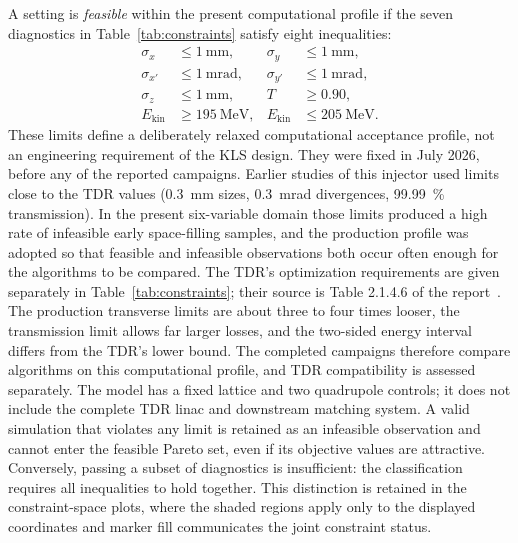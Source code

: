 \documentclass[aps,prab,reprint,superscriptaddress,amsmath,amssymb,floatfix]{revtex4-2}
\begin{document}
A setting is \emph{feasible} within the present computational profile if the seven diagnostics
in Table~\ref{tab:constraints} satisfy eight inequalities:
\begin{align}
 \sigma_x&\le\SI{1}{\milli\metre}, &\sigma_y&\le\SI{1}{\milli\metre},\\
 \sigma_{x'}&\le\SI{1}{\milli\radian}, &\sigma_{y'}&\le\SI{1}{\milli\radian},\\
 \sigma_z&\le\SI{1}{\milli\metre}, &T&\ge0.90,\\
 E_\mathrm{kin}&\ge\SI{195}{\mega\electronvolt}, &E_\mathrm{kin}&\le\SI{205}{\mega\electronvolt}.
\end{align}
These limits define a deliberately relaxed computational acceptance profile, not an
engineering requirement of the KLS design. They were fixed in July 2026, before any of the
reported campaigns. Earlier studies of this injector used limits close to the TDR values
(\SI{0.3}{\milli\metre} sizes, \SI{0.3}{\milli\radian} divergences, \SI{99.99}{\percent}
transmission). In the present six-variable domain those limits produced a high rate of
infeasible early space-filling samples, and the production profile was adopted so that
feasible and infeasible observations both occur often enough for the algorithms to be compared. The TDR's
optimization requirements are given separately in Table~\ref{tab:constraints}; their source
is Table 2.1.4.6 of the report~\cite{KLSTDR2025}. The production transverse limits are about
three to four times looser, the transmission limit allows far larger losses, and the two-sided
energy interval differs from the TDR's lower bound. The completed campaigns therefore compare
algorithms on this computational profile, and TDR compatibility is assessed separately. The model
has a fixed lattice and two quadrupole controls; it does not include the complete TDR
linac and downstream matching system. A valid
simulation that violates any limit is retained as an infeasible observation and cannot enter the
feasible Pareto set, even if its objective values are attractive. Conversely, passing a subset
of diagnostics is insufficient: the classification requires all inequalities to hold together.
This distinction is retained in the constraint-space plots, where the shaded regions apply only
to the displayed coordinates and marker fill communicates the joint constraint status.
\end{document}
